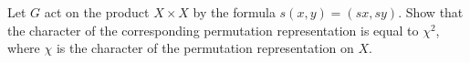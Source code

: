 Let $G$ act on the product $X \times X$ by the formula $s(x,y) = (sx, sy)$. Show that the character of the corresponding permutation representation is equal to $\chi^2$, where $\chi$ is the character of the permutation representation on $X$.